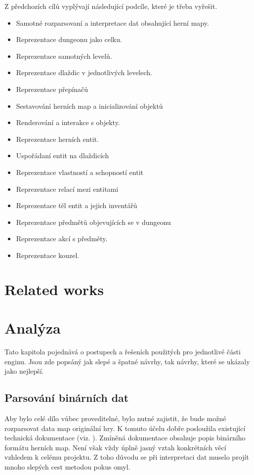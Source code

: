 Z předchozích cílů vyplývají následující podcíle, které je třeba vyřešit. 
\begin{itemize}
\item Samotné rozparsovaní a interpretace dat obsahující herní mapy. 
\item Reprezentace dungeonu jako celku.
\item Reprezentace samotných levelů.
\item Reprezentace dlaždic v jednotlivých levelech.
\item Reprezentace přepínačů 
\item Sestavování herních map a inicializování objektů
\item Renderování a interakce s objekty.
\item Reprezentace herních entit.
\item Uspořádaní entit na dlaždicích
\item Reprezentace vlastností a schopností entit
\item Reprezentace relací mezi entitami
\item Reprezentace těl entit a jejich inventářů
\item Reprezentace předmětů objevujících se v dungeonu
\item Reprezentace akcí s předměty.
\item Reprezentace kouzel.
\end{itemize}
	
\chapter{Related works}

\chapter{Analýza}
Tato kapitola pojednává o postupech a řešeních použitých pro jednotlivé části enginu. Jsou zde popsáný jak slepé a špatné
návrhy, tak návrhy, které se ukázaly jako nejlepší.

\section{Parsování binárních dat}
Aby bylo celé dílo vůbec proveditelné, bylo nutné zajistit, že bude možné rozparsovat data map originální hry. K tomuto účelu
dobře posloužila existující technická dokumentace (viz. \citet{TechnicalDocumentationFontanel05}). Zmíněná dokumentace obsahuje
popis binárního formátu herních map. Není však vždy úplně jasný vztah konkrétních věcí vzhledem k celému projektu. Z toho důvodu
se při interpretaci dat muselo projít mnoho slepých cest metodou pokus omyl. 


